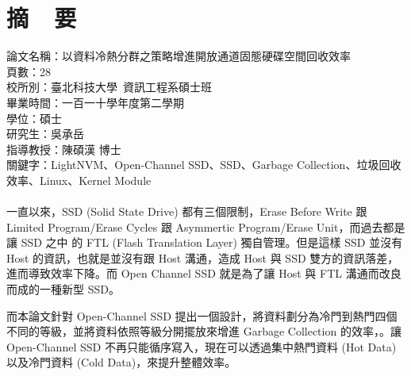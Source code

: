 \chapter*{摘~~要}


\noindent
論文名稱：以資料冷熱分群之策略增進開放通道固態硬碟空間回收效率 \\%
頁數：28\\
校所別：臺北科技大學~資訊工程系碩士班\\
畢業時間：一百一十學年度第二學期\\
學位：碩士\\
研究生：吳承岳\\
指導教授：陳碩漢 博士\\
\noindent
關鍵字：LightNVM、Open-Channel SSD、SSD、Garbage Collection、垃圾回收效率、Linux、Kernel Module\\
\hspace*{\fill}\\
%
\indent
一直以來，SSD (Solid State Drive) 都有三個限制，Erase Before Write 跟 Limited Program/Erase Cycles 跟 Asymmertic Program/Erase Unit，而過去都是讓 SSD 之中 的 FTL (Flash Translation Layer) 獨自管理。但是這樣 SSD 並沒有 Host 的資訊，也就是並沒有跟 Host 溝通，造成 Host 與 SSD 雙方的資訊落差，進而導致效率下降。而 Open Channel SSD 就是為了讓 Host 與 FTL 溝通而改良而成的一種新型 SSD。

\indent
而本論文針對 Open-Channel SSD 提出一個設計，將資料劃分為冷門到熱門四個不同的等級，並將資料依照等級分開擺放來增進 Garbage Collection 的效率，。讓 Open-Channel SSD 不再只能循序寫入，現在可以透過集中熱門資料 (Hot Data) 以及冷門資料 (Cold Data)，來提升整體效率。



